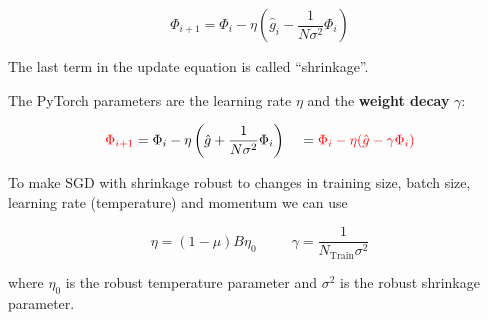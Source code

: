 {\vfill
$$\Phi_{i+1} = \Phi_i - \eta\left(\hat{g}_i  - \frac{1}{N\sigma^2}\Phi_i\right)$$

\vfill
The last term in the update equation is called ``shrinkage''.


The PyTorch parameters are the learning rate $\eta$ and the {\bf weight decay} $\gamma$:

$${\color{red} \Phi_{i+1}} = \Phi_i - \eta\left(\hat{g} + \frac{1}{N\sigma^2}\Phi_i\right)\;\;\;\; = {\color{red} \Phi_i - \eta(\hat{g} - \gamma\Phi_i)}$$

\vfill
To make SGD with shrinkage robust to changes in training size, batch size, learning rate (temperature) and momentum we can use

\vfill
{\color{red} $$\eta = (1-\mu)B\eta_0\;\;\;\;\;\;\;\;\;\gamma = \frac{1}{N_{\mathrm{Train}}\sigma^2}$$}

\vfill
where $\eta_0$ is the robust temperature parameter and $\sigma^2$ is the robust shrinkage parameter.


}

